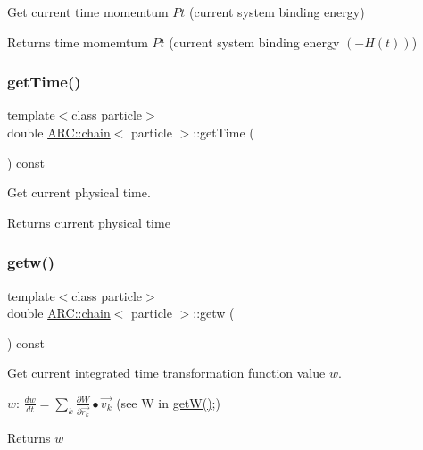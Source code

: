 Get current time momemtum $Pt$ (current system binding energy) 

\begin{DoxyReturn}{Returns}
time momemtum $Pt$ (current system binding energy $(-H(t))$) 
\end{DoxyReturn}
\hypertarget{classARC_1_1chain_a48bde99d89b99df54844e1331d4814bb}{}\label{classARC_1_1chain_a48bde99d89b99df54844e1331d4814bb} 
\subsubsection{\texorpdfstring{get\+Time()}{getTime()}}
{\footnotesize\ttfamily template$<$class particle$>$ \\
double \hyperlink{classARC_1_1chain}{A\+R\+C\+::chain}$<$ particle $>$\+::get\+Time (\begin{DoxyParamCaption}{ }\end{DoxyParamCaption}) const\hspace{0.3cm}{\ttfamily [inline]}}



Get current physical time. 

\begin{DoxyReturn}{Returns}
current physical time 
\end{DoxyReturn}
\hypertarget{classARC_1_1chain_a122985d69620f87c68ae43f4c87e4f00}{}\label{classARC_1_1chain_a122985d69620f87c68ae43f4c87e4f00} 
\subsubsection{\texorpdfstring{getw()}{getw()}}
{\footnotesize\ttfamily template$<$class particle$>$ \\
double \hyperlink{classARC_1_1chain}{A\+R\+C\+::chain}$<$ particle $>$\+::getw (\begin{DoxyParamCaption}{ }\end{DoxyParamCaption}) const\hspace{0.3cm}{\ttfamily [inline]}}



Get current integrated time transformation function value $w$. 

$w$\+: $ \frac{dw}{dt} = \sum_k \frac{\partial W}{\partial \vec{r_k}} \bullet \vec{v_k} $ (see W in \hyperlink{classARC_1_1chain_a43f7ea8573dcbc4849232c97be26456f}{get\+W()};) \begin{DoxyReturn}{Returns}
$w$ 
\end{DoxyReturn}
\hypertarget{classARC_1_1chain_a43f7ea8573dcbc4849232c97be26456f}{}\label{classARC_1_1chain_a43f7ea8573dcbc4849232c97be26456f} 

